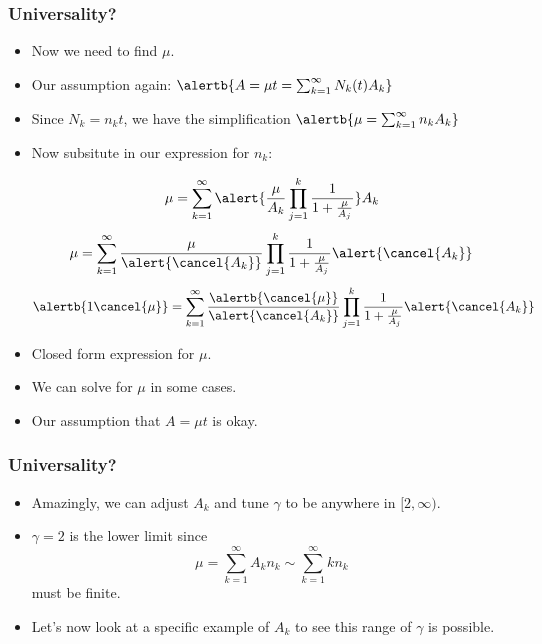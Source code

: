 \begin{frame}
  \frametitle{Universality?}

  \begin{itemize}
  \item<1->
    Now we need to find $\mu$.
  \item<2->
    Our assumption again:
    $
    \alertb{A = \mu t = \sum_{k=1}^{\infty} N_k(t) A_k}
    $
  \item<3->
    Since $N_k = n_k t$, we have the simplification
    $
    \alertb{
    \mu = \sum_{k=1}^{\infty} n_k A_k}
    $
  \item<4->
    Now subsitute in our expression for $n_k$:
    \begin{overprint}
    $$
    \mu = 
    \sum_{k=1}^{\infty} 
    \alert{
      \frac{\mu}{A_k}
      \prod_{j=1}^{k}
      \frac{1}{1 + \frac{\mu}{A_j}}
    }
    A_k
    $$
    $$
    \mu = 
    \sum_{k=1}^{\infty} 
    \frac{\mu}{\alert{\cancel{A_k}}}
    \prod_{j=1}^{k}
    \frac{1}{1 + \frac{\mu}{A_j}}
    \alert{\cancel{A_k}}
    $$
    $$
    \alertb{1 \cancel{\mu}} = 
    \sum_{k=1}^{\infty} 
    \frac{\alertb{\cancel{\mu}}}{\alert{\cancel{A_k}}}
    \prod_{j=1}^{k}
    \frac{1}{1 + \frac{\mu}{A_j}}
    \alert{\cancel{A_k}}
    $$
    \end{overprint}
    \item<8->
      Closed form expression for $\mu$.
    \item<9->
      We can solve for $\mu$ in some cases.
    \item<10->
      Our assumption that $A = \mu t$ is okay.
  \end{itemize}

\end{frame}

\begin{frame}
  \frametitle{Universality?}

  \begin{itemize}
  \item<1->
    Amazingly, we can adjust $A_k$ and tune $\gamma$
    to be anywhere in $[2,\infty)$.
  \item<2->
    $\gamma = 2$ is the lower limit since
    $$
    \mu = 
    \sum_{k=1}^{\infty} A_k n_k 
    \sim
    \sum_{k=1}^{\infty} k n_k
    $$
    must be finite.
  \item<3->
    Let's now look at a specific example of $A_k$
    to see this range of $\gamma$ is possible.
  \end{itemize}
\end{frame}

